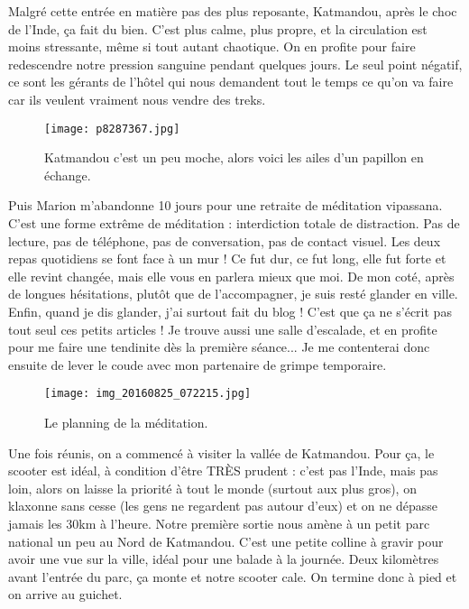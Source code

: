 \documentclass{book}
\begin{document}
Malgré cette entrée en matière pas des plus reposante, Katmandou, après le choc de l'Inde, ça fait du bien. C'est plus calme, plus propre, et la circulation est moins stressante, même si tout autant chaotique. On en profite pour faire redescendre notre pression sanguine pendant quelques jours. Le seul point négatif, ce sont les gérants de l'hôtel qui nous demandent tout le temps ce qu'on va faire car ils veulent vraiment nous vendre des treks.


\begin{figure}[h]
\centering
\texttt{[image: p8287367.jpg]}
\caption*{Katmandou c'est un peu moche, alors voici les ailes d'un papillon en échange.}
\end{figure}

Puis Marion m'abandonne 10 jours pour une retraite de méditation vipassana. C'est une forme extrême de méditation : interdiction totale de distraction. Pas de lecture, pas de téléphone, pas de conversation, pas de contact visuel. Les deux repas quotidiens se font face à un mur ! Ce fut dur, ce fut long, elle fut forte et elle revint changée, mais elle vous en parlera mieux que moi. De mon coté, après de longues hésitations, plutôt que de l'accompagner, je suis resté glander en ville. Enfin, quand je dis glander, j'ai surtout fait du blog ! C'est que ça ne s'écrit pas tout seul ces petits articles ! Je trouve aussi une salle d'escalade, et en profite pour me faire une tendinite dès la première séance... Je me contenterai donc ensuite de lever le coude avec mon partenaire de grimpe temporaire.


\begin{figure}[h]
\centering
\texttt{[image: img\_20160825\_072215.jpg]}
\caption*{Le planning de la méditation.}
\end{figure}

Une fois réunis, on a commencé à visiter la vallée de Katmandou. Pour ça, le scooter est idéal, à condition d'être TRÈS prudent : c'est pas l'Inde, mais pas loin, alors on laisse la priorité à tout le monde (surtout aux plus gros), on klaxonne sans cesse (les gens ne regardent pas autour d'eux) et on ne dépasse jamais les 30km à l'heure. Notre première sortie nous amène à un petit parc national un peu au Nord de Katmandou. C'est une petite colline à gravir pour avoir une vue sur la ville, idéal pour une balade à la journée. Deux kilomètres avant l'entrée du parc, ça monte et notre scooter cale. On termine donc à pied et on arrive au guichet.
\end{document}
